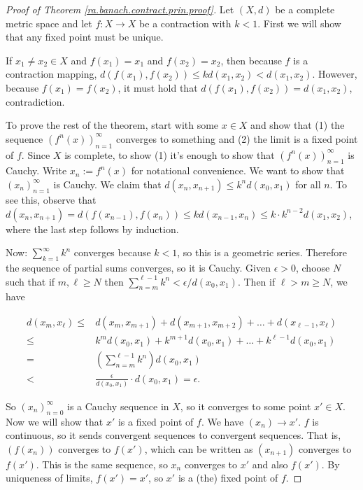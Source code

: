 \begin{proof}[Proof of Theorem \ref{ra.banach.contract.prin.proof}]

Let \((X,d)\) be a complete metric space and let \(f: X \to X\) be a contraction with \(k < 1\). First we will show that any fixed point must be unique.

If \(x_1 \neq x_2 \in X\) and \(f(x_1) = x_1\) and \(f(x_2) = x_2\), then because \(f\) is a contraction mapping, \(d(f(x_1), f(x_2)) \leq k d(x_1, x_2) < d(x_1, x_2)\). However, because \(f(x_1) = f(x_2)\), it must hold that \(d(f(x_1), f(x_2)) = d(x_1, x_2)\), contradiction.

To prove the rest of the theorem, start with some \(x \in X\) and show that (1) the sequence \((f^n(x))_{n=1}^\infty\) converges to something and (2) the limit is a fixed point of \(f\). Since \(X\) is complete, to show (1) it's enough to show that \((f^n(x))_{n=1}^\infty\) is Cauchy. Write \(x_n := f^n(x)\) for notational convenience. We want to show that \((x_n)_{n=1}^\infty\) is Cauchy. We claim that \(d(x_n, x_{n+1}) \leq k^{n} d(x_0, x_1)\) for all \(n\). To see this, observe that \(d(x_n, x_{n+1}) = d(f(x_{n-1}), f(x_n)) \leq k d(x_{n-1}, x_n) \leq k \cdot k^{n-2}d(x_1, x_2)\), where the last step follows by induction.

Now: \(\sum_{k=1}^\infty k^n\) converges because \(k < 1\), so this is a geometric series. Therefore the sequence of partial sums converges, so it is Cauchy. Given \(\epsilon > 0\), choose \(N\) such that if \(m, \ell \geq N\) then \(\sum_{n=m}^{\ell - 1} k^n < \epsilon/d(x_0, x_1)\). Then if \(\ell > m \geq N\), we have

\begin{align*}
d(x_m, x_\ell) \leq &  d(x_m, x_{m+1}) + d(x_{m+1},  x_{m+2}) + \ldots + d(x_{\ell-1}, x_\ell)
\\ \leq & k^m d(x_0, x_{1}) + k^{m+1} d(x_{0}, x_{1}) + \ldots + k^{\ell - 1} d(x_0, x_1)
\\ = & \left( \sum_{n=m}^{\ell-1} k^n \right) d(x_0, x_1)
\\ < & \frac{\epsilon}{d(x_0, x_1)} \cdot d(x_0, x_1) = \epsilon.
\end{align*}

So \((x_n)_{n=0}^\infty\) is a Cauchy sequence in \(X\), so it converges to some point \(x' \in X\). Now we will show that \(x'\) is a fixed point of \(f\). We have \((x_n) \to x'\). \(f\) is continuous, so it sends convergent sequences to convergent sequences. That is, \((f(x_n))\) converges to \(f(x')\), which can be written as \((x_{n+1})\) converges to \(f(x')\). This is the same sequence, so \(x_n\) converges to \(x'\) and also \(f(x')\). By uniqueness of limits, \(f(x') = x'\), so \(x'\) is a (the) fixed point of \(f\).

\end{proof}


